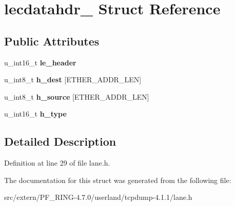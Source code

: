 \hypertarget{structlecdatahdr__8023}{
\section{lecdatahdr\_ Struct Reference}
\label{structlecdatahdr__8023}
}
\subsection*{Public Attributes}
\begin{DoxyCompactItemize}
\item 
\hypertarget{structlecdatahdr__8023_a1bc88942f196be5722c9a3ce9ef0ecf2}{
u\_\-int16\_\-t {\bfseries le\_\-header}}
\label{structlecdatahdr__8023_a1bc88942f196be5722c9a3ce9ef0ecf2}

\item 
\hypertarget{structlecdatahdr__8023_a4604945511a54179daec85ed70e1b15a}{
u\_\-int8\_\-t {\bfseries h\_\-dest} \mbox{[}ETHER\_\-ADDR\_\-LEN\mbox{]}}
\label{structlecdatahdr__8023_a4604945511a54179daec85ed70e1b15a}

\item 
\hypertarget{structlecdatahdr__8023_a0010eb7dc7397d5bc53bb5759323ba26}{
u\_\-int8\_\-t {\bfseries h\_\-source} \mbox{[}ETHER\_\-ADDR\_\-LEN\mbox{]}}
\label{structlecdatahdr__8023_a0010eb7dc7397d5bc53bb5759323ba26}

\item 
\hypertarget{structlecdatahdr__8023_a99bcd1262378c9fbf6e778b8b4fa65a5}{
u\_\-int16\_\-t {\bfseries h\_\-type}}
\label{structlecdatahdr__8023_a99bcd1262378c9fbf6e778b8b4fa65a5}

\end{DoxyCompactItemize}


\subsection{Detailed Description}


Definition at line 29 of file lane.h.



The documentation for this struct was generated from the following file:\begin{DoxyCompactItemize}
\item 
src/extern/PF\_\-RING-\/4.7.0/userland/tcpdump-\/4.1.1/lane.h\end{DoxyCompactItemize}
